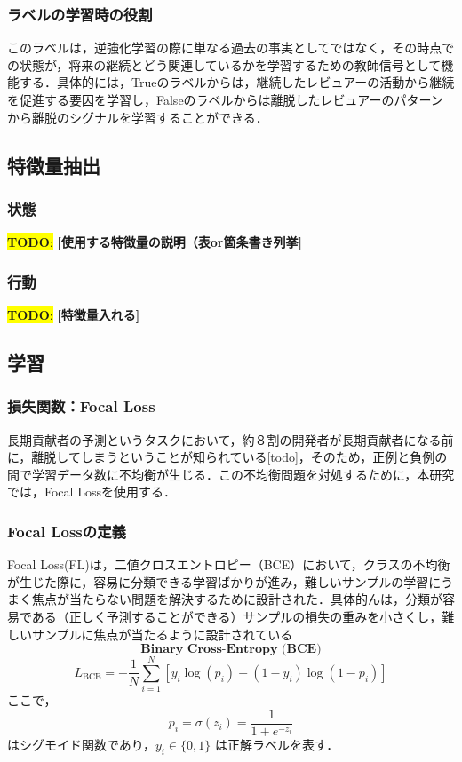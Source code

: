 \documentclass[submit,techrep,noauthor]{ipsj}
\newcommand{\todo}[1]{\colorbox{yellow}{{\bf TODO}:}{\color{red} {\textbf{[#1]}}}}
\begin{document}
\subsubsection{ラベルの学習時の役割}
このラベルは，逆強化学習の際に単なる過去の事実としてではなく，その時点での状態が，将来の継続とどう関連しているかを学習するための教師信号として機能する．具体的には，Trueのラベルからは，継続したレビュアーの活動から継続を促進する要因を学習し，Falseのラベルからは離脱したレビュアーのパターンから離脱のシグナルを学習することができる．

\subsection{特徴量抽出}
\subsubsection{状態}
\todo{使用する特徴量の説明（表or箇条書き列挙}
\subsubsection{行動}
\todo{特徴量入れる}

\subsection{学習}
\subsubsection{損失関数：Focal Loss}
長期貢献者の予測というタスクにおいて，約８割の開発者が長期貢献者になる前に，離脱してしまうということが知られている[todo]，そのため，正例と負例の間で学習データ数に不均衡が生じる．この不均衡問題を対処するために，本研究では，Focal Lossを使用する．
\subsubsection{Focal Lossの定義}
Focal Loss(FL)は，二値クロスエントロピー（BCE）において，クラスの不均衡が生じた際に，容易に分類できる学習ばかりが進み，難しいサンプルの学習にうまく焦点が当たらない問題を解決するために設計された．具体的んは，分類が容易である（正しく予測することができる）サンプルの損失の重みを小さくし，難しいサンプルに焦点が当たるように設計されている
\[\textbf{Binary Cross-Entropy (BCE)}\]
\[
L_{\mathrm{BCE}} = - \frac{1}{N} \sum_{i=1}^{N} \left[ y_i\log(p_i) + (1 - y_i)\log(1 - p_i)\right]
\]
ここで，
\[p_i = \sigma(z_i) = \frac{1}{1 + e^{-z_i}}\]はシグモイド関数であり，\(y_i \in \{0,1\}\) は正解ラベルを表す．
\end{document}
